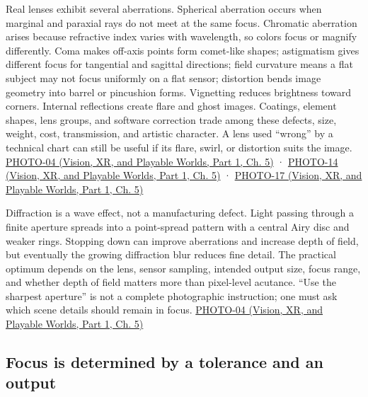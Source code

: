 Real lenses exhibit several aberrations. Spherical aberration occurs when marginal and paraxial rays do not meet at the same focus. Chromatic aberration arises because refractive index varies with wavelength, so colors focus or magnify differently. Coma makes off-axis points form comet-like shapes; astigmatism gives different focus for tangential and sagittal directions; field curvature means a flat subject may not focus uniformly on a flat sensor; distortion bends image geometry into barrel or pincushion forms. Vignetting reduces brightness toward corners. Internal reflections create flare and ghost images. Coatings, element shapes, lens groups, and software correction trade among these defects, size, weight, cost, transmission, and artistic character. A lens used ``wrong'' by a technical chart can still be useful if its flare, swirl, or distortion suits the image. \href{../07-Vision-XR-and-Playable-Worlds-P01/main.pdf\#nameddest=04-visual-computing-ii-ch036-photo-04---photography-session-04}{PHOTO-04 (Vision, XR, and Playable Worlds, Part 1, Ch. 5)} · \href{../07-Vision-XR-and-Playable-Worlds-P01/main.pdf\#nameddest=04-visual-computing-ii-ch036-photo-14---photography-session-14}{PHOTO-14 (Vision, XR, and Playable Worlds, Part 1, Ch. 5)} · \href{../07-Vision-XR-and-Playable-Worlds-P01/main.pdf\#nameddest=04-visual-computing-ii-ch036-photo-17---photography-session-17}{PHOTO-17 (Vision, XR, and Playable Worlds, Part 1, Ch. 5)}

Diffraction is a wave effect, not a manufacturing defect. Light passing through a finite aperture spreads into a point-spread pattern with a central Airy disc and weaker rings. Stopping down can improve aberrations and increase depth of field, but eventually the growing diffraction blur reduces fine detail. The practical optimum depends on the lens, sensor sampling, intended output size, focus range, and whether depth of field matters more than pixel-level acutance. ``Use the sharpest aperture'' is not a complete photographic instruction; one must ask which scene details should remain in focus. \href{../07-Vision-XR-and-Playable-Worlds-P01/main.pdf\#nameddest=04-visual-computing-ii-ch036-photo-04---photography-session-04}{PHOTO-04 (Vision, XR, and Playable Worlds, Part 1, Ch. 5)}

\subsection{Focus is determined by a tolerance and an output}\label{03-visual-computing-i-ch003-focus-is-determined-by-a-tolerance-and-an-output}

